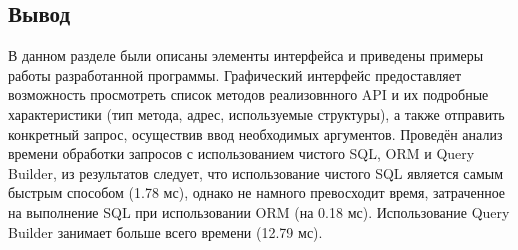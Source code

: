 \subsection*{Вывод}
В данном разделе были описаны элементы интерфейса и приведены примеры работы разработанной программы. 
Графический интерфейс предоставляет возможность просмотреть список методов реализовнного API и их подробные характеристики (тип метода, адрес, используемые структуры), а также отправить конкретный запрос, осуществив ввод необходимых аргументов.
Проведён анализ времени обработки запросов с использованием чистого SQL, ORM и Query Builder, из результатов следует, что использование чистого SQL является самым быстрым способом (1.78 мс), однако не намного превосходит время, затраченное на выполнение SQL при использовании ORM (на 0.18 мс). Использование Query Builder занимает больше всего времени (12.79 мс).




